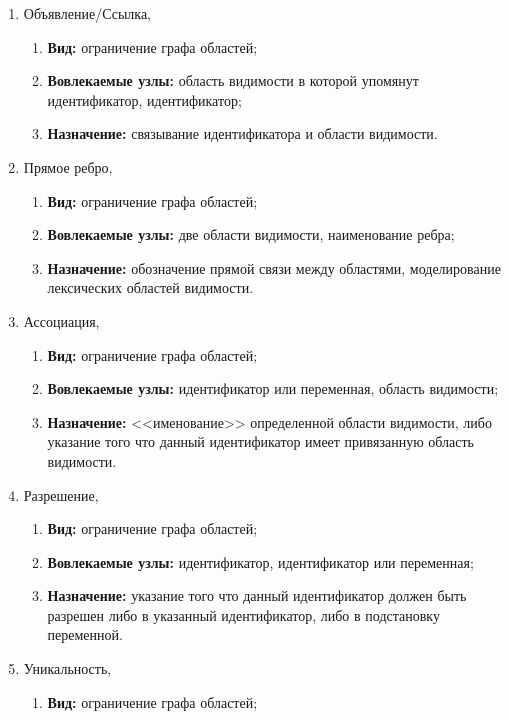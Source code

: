 \begin{enumerate}
    \item Объявление\slash Ссылка,
        \begin{enumerate}
        \item \textbf{Вид:} ограничение графа областей;
        \item \textbf{Вовлекаемые узлы:} область видимости в которой упомянут идентификатор, идентификатор;
        \item \textbf{Назначение:} связывание идентификатора и области видимости.
        \end{enumerate}
    \item Прямое ребро,
    \begin{enumerate}
        \item \textbf{Вид:} ограничение графа областей; 
        \item \textbf{Вовлекаемые узлы:} две области видимости, наименование ребра;
        \item \textbf{Назначение:} обозначение прямой связи
        между областями, моделирование лексических областей видимости.
    \end{enumerate}
    \item Ассоциация,
    \begin{enumerate}
        \item \textbf{Вид:} ограничение графа областей;
        \item \textbf{Вовлекаемые узлы:} идентификатор или переменная, область видимости;
        \item \textbf{Назначение:} <<именование>> определенной
        области видимости, либо указание того что данный идентификатор имеет привязанную область видимости.
    \end{enumerate}
    \item Разрешение,
    \begin{enumerate}
        \item \textbf{Вид:} ограничение графа областей;
        \item \textbf{Вовлекаемые узлы:} идентификатор, идентификатор или переменная;
        \item \textbf{Назначение:} указание того что
        данный идентификатор должен быть разрешен либо в указанный идентификатор, либо в подстановку переменной.
    \end{enumerate}
    \item Уникальность,
    \begin{enumerate}
        \item \textbf{Вид:} ограничение графа областей;

\end{enumerate}
\end{enumerate}
